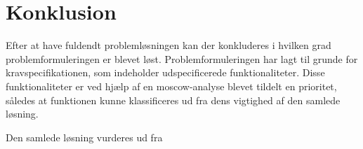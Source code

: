 \chapter{Konklusion}
\label{sec:konklusion}

Efter at have fuldendt problemløsningen kan der konkluderes i hvilken grad problemformuleringen er blevet løst.
Problemformuleringen har lagt til grunde for kravspecifikationen, som indeholder udspecificerede funktionaliteter.
Disse funktionaliteter er ved hjælp af en \gls{moscow}-analyse blevet tildelt en prioritet, således at funktionen kunne klassificeres ud fra dens vigtighed af den samlede løsning.

Den samlede løsning vurderes ud fra 

